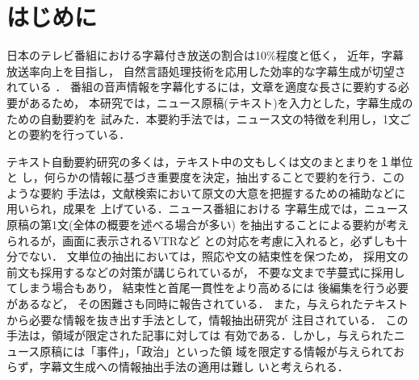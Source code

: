 


\maketitle
\newpage
\section{はじめに}
\label{section:intro}

日本のテレビ番組における字幕付き放送の割合は10\%程度と低く，
近年，字幕放送率向上を目指し，
自然言語処理技術を応用した効率的な字幕生成が切望されている
\cite{EharaAndSawamuraAndWakaoAndAbeAndShirai1997}．
番組の音声情報を字幕化するには，文章を適度な長さに要約する必要があるため，
本研究では，ニュース原稿(テキスト)を入力とした，字幕生成のための自動要約を
試みた．本要約手法では，ニュース文の特徴を利用し，1文ごとの要約を行っている．

テキスト自動要約研究の多くは，テキスト中の文もしくは文のまとまりを１単位と
し，何らかの情報に基づき重要度を決定，抽出することで要約を行う．このような要約
手法は，文献検索において原文の大意を把握するための補助などに用いられ，成果を
上げている\cite{SumitaAndChinoAndOnoAndMiike1995}．ニュース番組における
字幕生成では，ニュース原稿の第1文(全体の概要を述べる場合が多い)
を抽出することによる要約が考えられるが，画面に表示されるVTRなど
との対応を考慮に入れると，必ずしも十分でない．
文単位の抽出においては，照応や文の結束性を保つため，
採用文の前文も採用するなどの対策が講じられているが\cite{ChrisD.Paice1990}，
不要な文まで芋蔓式に採用してしまう場合もあり，
結束性と首尾一貫性をより高めるには
後編集を行う必要があるなど，
その困難さも同時に報告されている\cite{YamamotoAndMasuyamaAndNaito1995}．
また，与えられたテキストから必要な情報を抜き出す手法として，情報抽出研究が
注目されている\cite{JimCowieAndWendyLehnert1996}．
この手法は，領域が限定された記事に対しては
有効である．しかし，与えられたニュース原稿には「事件」，「政治」といった領
域を限定する情報が与えられておらず，字幕文生成への情報抽出手法の適用は難し
いと考えられる．

